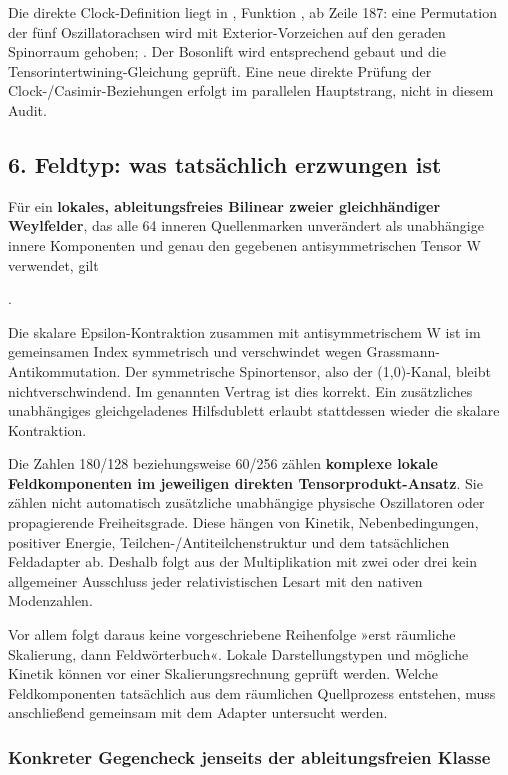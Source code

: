 Die direkte Clock-Definition liegt in
,
Funktion , ab Zeile 187: eine Permutation der fünf
Oszillatorachsen wird mit Exterior-Vorzeichen auf den geraden Spinorraum
gehoben; . Der Bosonlift wird entsprechend gebaut
und die Tensorintertwining-Gleichung geprüft. Eine neue direkte Prüfung
der Clock-/Casimir-Beziehungen erfolgt im parallelen Hauptstrang, nicht
in diesem Audit.

\subsection{6. Feldtyp: was tatsächlich erzwungen
ist}\label{feldtyp-was-tatsuxe4chlich-erzwungen-ist}

Für ein \textbf{lokales, ableitungsfreies Bilinear zweier gleichhändiger
Weylfelder}, das alle 64 inneren Quellenmarken unverändert als
unabhängige innere Komponenten und genau den gegebenen antisymmetrischen
Tensor W verwendet, gilt

.

Die skalare Epsilon-Kontraktion zusammen mit antisymmetrischem W ist im
gemeinsamen Index symmetrisch und verschwindet wegen
Grassmann-Antikommutation. Der symmetrische Spinortensor, also der
(1,0)-Kanal, bleibt nichtverschwindend. Im genannten Vertrag ist dies
korrekt. Ein zusätzliches unabhängiges gleichgeladenes Hilfsdublett
erlaubt stattdessen wieder die skalare Kontraktion.

Die Zahlen 180/128 beziehungsweise 60/256 zählen \textbf{komplexe lokale
Feldkomponenten im jeweiligen direkten Tensorprodukt-Ansatz}. Sie zählen
nicht automatisch zusätzliche unabhängige physische Oszillatoren oder
propagierende Freiheitsgrade. Diese hängen von Kinetik,
Nebenbedingungen, positiver Energie, Teilchen-/Antiteilchenstruktur und
dem tatsächlichen Feldadapter ab. Deshalb folgt aus der Multiplikation
mit zwei oder drei kein allgemeiner Ausschluss jeder relativistischen
Lesart mit den nativen Modenzahlen.

Vor allem folgt daraus keine vorgeschriebene Reihenfolge »erst räumliche
Skalierung, dann Feldwörterbuch«. Lokale Darstellungstypen und mögliche
Kinetik können vor einer Skalierungsrechnung geprüft werden. Welche
Feldkomponenten tatsächlich aus dem räumlichen Quellprozess entstehen,
muss anschließend gemeinsam mit dem Adapter untersucht werden.

\subsubsection{Konkreter Gegencheck jenseits der ableitungsfreien
Klasse}\label{konkreter-gegencheck-jenseits-der-ableitungsfreien-klasse}

